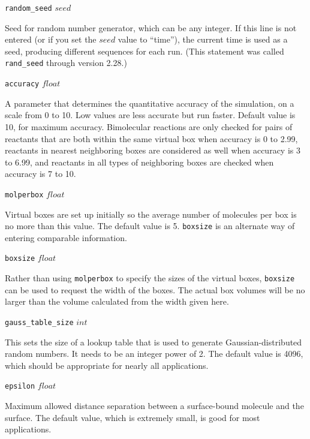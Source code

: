 \documentclass {book}
\newcommand {\ttt} {\texttt}
\begin{document}
\begin{description}

\item{\ttt{random\_seed} $seed$}

Seed for random number generator, which can be any integer. If this line is not entered (or if you set the $seed$ value to ``time''), the current time is used as a seed, producing different sequences for each run. (This statement was called \ttt{rand\_seed} through version 2.28.)

\item{\ttt{accuracy} $float$}

A parameter that determines the quantitative accuracy of the simulation, on a scale from 0 to 10. Low values are less accurate but run faster. Default value is 10, for maximum accuracy. Bimolecular reactions are only checked for pairs of reactants that are both within the same virtual box when accuracy is 0 to 2.99, reactants in nearest neighboring boxes are considered as well when accuracy is 3 to 6.99, and reactants in all types of neighboring boxes are checked when accuracy is 7 to 10.

\item{\ttt{molperbox} $float$}

Virtual boxes are set up initially so the average number of molecules per box is no more than this value. The default value is 5. \ttt{boxsize} is an alternate way of entering comparable information.

\item{\ttt{boxsize} $float$}

Rather than using \ttt{molperbox} to specify the sizes of the virtual boxes, \ttt{boxsize} can be used to request the width of the boxes. The actual box volumes will be no larger than the volume calculated from the width given here.

\item{\ttt{gauss\_table\_size} $int$}

This sets the size of a lookup table that is used to generate Gaussian-distributed random numbers. It needs to be an integer power of 2. The default value is 4096, which should be appropriate for nearly all applications.

\item{\ttt{epsilon} $float$}

Maximum allowed distance separation between a surface-bound molecule and the surface. The default value, which is extremely small, is good for most applications.


\end{description}
\end{document}

